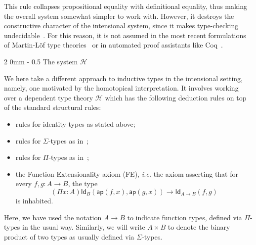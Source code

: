 \documentclass[reqno,10pt,a4paper,oneside]{amsart}
\makeatletter
\newcommand{\Id}{\mathsf{Id}}
\newcommand{\id}[1]{\Id_{#1}}
\newcommand{\app}{\mathsf{ap}}
\newcommand{\Hint}{\mathcal{H}}
\renewcommand{\subsection}{\@startsection
  {subsection}%
  {2}%
  {0mm}%
  {-\baselineskip}%
  {0.5\baselineskip}%
  {\normalfont\normalsize\bf}}%
\numberwithin{equation}{section}
\theoremstyle{mythm}
\theoremstyle{mydef}
\theoremstyle{myrmk}
\makeatother
\begin{document}
This rule collapses propositional equality with definitional equality, thus making the overall system
somewhat simpler to work with. However, it destroys the constructive character of the intensional system, since it makes type-checking undecidable~\cite{HofmannM:extcit}. For this reason, it is not assumed
in the most recent formulations of Martin-L\"of type theories~\cite{NordstromB:marltt} or in automated proof assistants like Coq~\cite{BertotY:inttpp}.




\subsection{The system $\Hint$} 

\noindent We here take a different approach to inductive types in the intensional setting, namely, one motivated by the homotopical interpretation.  It involves working over a dependent type theory $\Hint$ which has the following deduction rules on top of the standard structural rules:
\begin{itemize}
\item rules for identity types as stated above;
\item rules for $\Sigma$-types as in~\cite[Section~5.8]{NordstromB:marltt};
\item rules for $\Pi$-types as in~\cite[Section~3.2]{GarnerR:strdpt}; 
\item the Function Extensionality axiom (FE), \emph{i.e.} the axiom asserting that
for every $f, g : A \rightarrow B$, the type
\[
(\Pi x :  A)\id{B}( \app(f, x), \app(g, x)) \rightarrow \id{A \rightarrow B}(f,g) 
\]
is inhabited.
\end{itemize}
Here, we have used the notation $A \rightarrow B$ to indicate function types, defined via
$\Pi$-types in the usual way. Similarly, we will write $A \times B$ to denote the binary product
of two types as usually defined via $\Sigma$-types.
\smallskip
\end{document}
